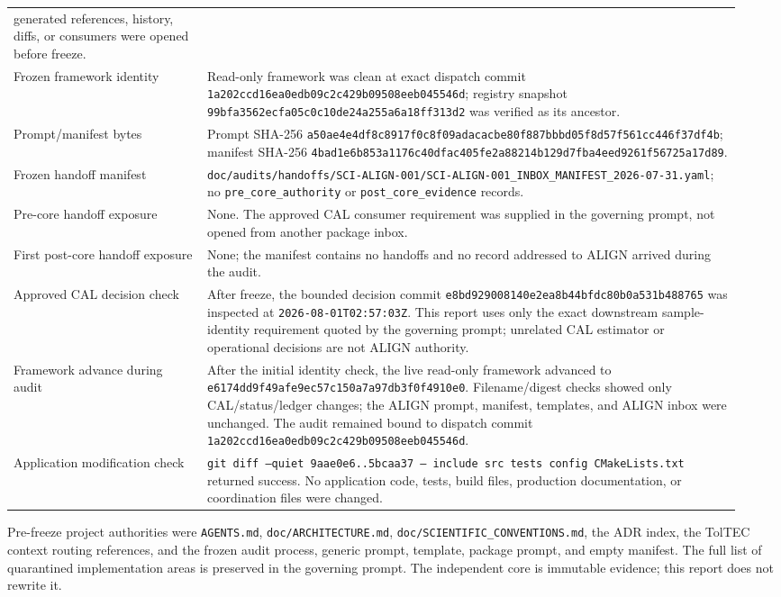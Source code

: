 \documentclass[11pt]{article}
\newcommand{\code}[1]{\nolinkurl{#1}}
\newcommand{\AuditPromptSHAPrint}{\code{a50ae4e4df8c8917f0c8f09adacacbe8}\allowbreak\code{0f887bbbd05f8d57f561cc446f37df4b}}
\newcommand{\AuditManifestSHAPrint}{\code{4bad1e6b853a1176c40dfac405fe2a882}\allowbreak\code{14b129d7fba4eed9261f56725a17d89}}
\begin{document}
\begin{longtable}{L{0.25\linewidth}L{0.69\linewidth}}
generated references, history, diffs, or consumers were opened before freeze.\\
Frozen framework identity & Read-only framework was clean at exact dispatch
commit \code{1a202ccd16ea0edb09c2c429b09508eeb045546d}; registry snapshot
\code{99bfa3562ecfa05c0c10de24a255a6a18ff313d2} was verified as its ancestor.\\
Prompt/manifest bytes & Prompt SHA-256
\AuditPromptSHAPrint;
manifest SHA-256
\AuditManifestSHAPrint.\\
Frozen handoff manifest &
\code{doc/audits/handoffs/SCI-ALIGN-001/SCI-ALIGN-001_INBOX_MANIFEST_2026-07-31.yaml};
no \texttt{pre\_core\_authority} or \texttt{post\_core\_evidence} records.\\
Pre-core handoff exposure & None.  The approved CAL consumer requirement was
supplied in the governing prompt, not opened from another package inbox.\\
First post-core handoff exposure & None; the manifest contains no handoffs and
no record addressed to ALIGN arrived during the audit.\\
Approved CAL decision check & After freeze, the bounded decision commit
\code{e8bd929008140e2ea8b44bfdc80b0a531b488765} was inspected at
\code{2026-08-01T02:57:03Z}.  This report uses only the exact downstream
sample-identity requirement quoted by the governing prompt; unrelated CAL
estimator or operational decisions are not ALIGN authority.\\
Framework advance during audit & After the initial identity check, the live
read-only framework advanced to
\code{e6174dd9f49afe9ec57c150a7a97db3f0f4910e0}.  Filename/digest checks showed
only CAL/status/ledger changes; the ALIGN prompt, manifest, templates, and
ALIGN inbox were unchanged.  The audit remained bound to dispatch commit
\code{1a202ccd16ea0edb09c2c429b09508eeb045546d}.\\
Application modification check &
\texttt{git diff --quiet 9aae0e6..5bcaa37 -- include src tests config CMakeLists.txt}
returned success.  No application code, tests, build files, production
documentation, or coordination files were changed.\\
\bottomrule
\end{longtable}

Pre-freeze project authorities were \code{AGENTS.md},
\code{doc/ARCHITECTURE.md}, \code{doc/SCIENTIFIC_CONVENTIONS.md}, the ADR
index, the TolTEC context routing references, and the frozen audit process,
generic prompt, template, package prompt, and empty manifest.  The full list
of quarantined implementation areas is preserved in the governing prompt.
The independent core is immutable evidence; this report does not rewrite it.
\end{document}
